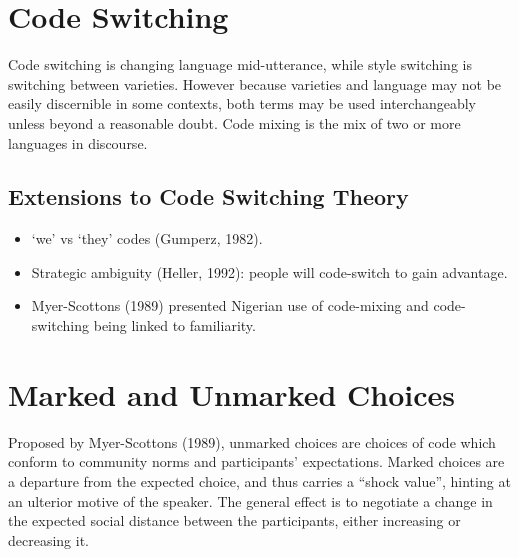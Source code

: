 \documentclass[../main.tex]{subfiles}
\begin{document}
    \section{Code Switching}
    Code switching is changing language mid-utterance, while style switching is switching between varieties. However because varieties and language may not be easily discernible in some contexts, both terms may be used interchangeably unless beyond a reasonable doubt. Code mixing is the mix of two or more languages in discourse. 

    \subsection{Extensions to Code Switching Theory}
    \begin{itemize}
        \item `we' vs `they' codes (Gumperz, 1982).
        \item Strategic ambiguity (Heller, 1992): people will code-switch to gain advantage.
        \item Myer-Scottons (1989) presented Nigerian use of code-mixing and code-switching being linked to familiarity.
    \end{itemize}

    \section{Marked and Unmarked Choices}
    Proposed by Myer-Scottons (1989), unmarked choices are choices of code which conform to community norms and participants' expectations. Marked choices are a departure from the expected choice, and thus carries a ``shock value'', hinting at an ulterior motive of the speaker. The general effect is to negotiate a change in the expected social distance between the participants, either increasing or decreasing it. 
\end{document}

